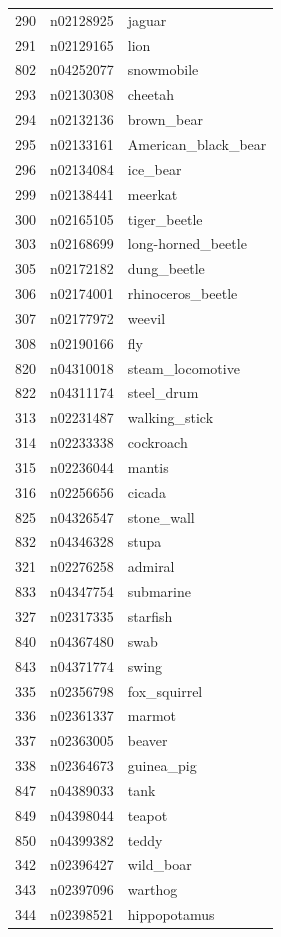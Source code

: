 \begin{table}
\begin{tabular}{cll}
290 & n02128925 & jaguar \\
291 & n02129165 & lion \\
802 & n04252077 & snowmobile \\
293 & n02130308 & cheetah \\
294 & n02132136 & brown_bear \\
295 & n02133161 & American_black_bear \\
296 & n02134084 & ice_bear \\
299 & n02138441 & meerkat \\
300 & n02165105 & tiger_beetle \\
303 & n02168699 & long-horned_beetle \\
305 & n02172182 & dung_beetle \\
306 & n02174001 & rhinoceros_beetle \\
307 & n02177972 & weevil \\
308 & n02190166 & fly \\
820 & n04310018 & steam_locomotive \\
822 & n04311174 & steel_drum \\
313 & n02231487 & walking_stick \\
314 & n02233338 & cockroach \\
315 & n02236044 & mantis \\
316 & n02256656 & cicada \\
825 & n04326547 & stone_wall \\
832 & n04346328 & stupa \\
321 & n02276258 & admiral \\
833 & n04347754 & submarine \\
327 & n02317335 & starfish \\
840 & n04367480 & swab \\
843 & n04371774 & swing \\
335 & n02356798 & fox_squirrel \\
336 & n02361337 & marmot \\
337 & n02363005 & beaver \\
338 & n02364673 & guinea_pig \\
847 & n04389033 & tank \\
849 & n04398044 & teapot \\
850 & n04399382 & teddy \\
342 & n02396427 & wild_boar \\
343 & n02397096 & warthog \\
344 & n02398521 & hippopotamus \\

\end{tabular}
\end{table}
